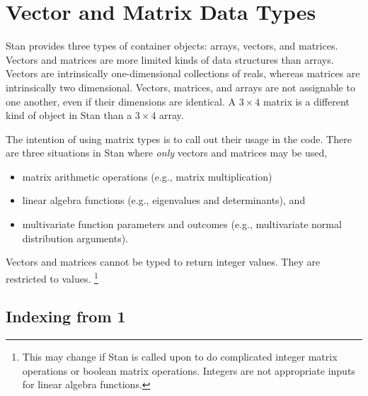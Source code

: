 \section{Vector and Matrix Data Types}

Stan provides three types of container objects: arrays, vectors, and
matrices. Vectors and matrices are more limited kinds of data
structures than arrays.  Vectors are intrinsically one-dimensional
collections of reals, whereas matrices are intrinsically two
dimensional.  Vectors, matrices, and arrays are not assignable to one
another, even if their dimensions are identical.  A $3 \times 4$
matrix is a different kind of object in Stan than a $3 \times 4$
array.

The intention of using matrix types is to call out their usage in the
code.  There are three situations in Stan where {\it only} vectors and
matrices may be used,
%
\begin{itemize}
\item matrix arithmetic operations (e.g., matrix multiplication)
\item linear algebra functions (e.g., eigenvalues and determinants),
  and
\item multivariate function parameters and outcomes (e.g.,
  multivariate normal distribution arguments).
\end{itemize}
%

Vectors and matrices cannot be typed to return integer values.  They
are restricted to  values.%
%
\footnote{This may change if Stan is called upon to do complicated
  integer matrix operations or boolean matrix operations.  Integers
  are not appropriate inputs for linear algebra functions.}




\subsection{Indexing from 1}

